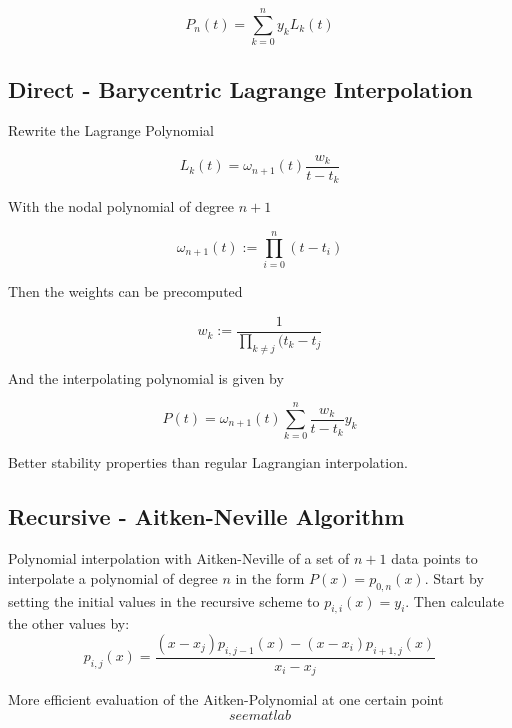 \documentclass[
    a4paper,
    11pt
]{article}
\begin{document}
\begin{equation}
    P_n(t) = \sum_{k=0}^n y_k L_k(t)
\end{equation}

\subsection{Direct - Barycentric Lagrange Interpolation}

Rewrite the Lagrange Polynomial

\begin{equation}
    L_k(t) = \omega_{n+1}(t) \frac{w_k}{t-t_k}
\end{equation}

With the nodal polynomial of degree $n+1$

\begin{equation}
    \omega_{n+1}(t) := \prod_{i=0}^n (t - t_i)
\end{equation}

Then the weights can be precomputed

\begin{equation}
    w_k := \frac{1}{\prod_{k\neq j} (t_k - t_j}
\end{equation}

And the interpolating polynomial is given by

\begin{equation}
    P(t) = \omega_{n+1}(t) \sum_{k=0}^n \frac{w_k}{t-t_k} y_k
\end{equation}

Better stability properties than regular Lagrangian interpolation.

\subsection{Recursive - Aitken-Neville Algorithm}

Polynomial interpolation with Aitken-Neville of a set of $n+1$ data points to
interpolate a polynomial of degree $n$ in the form $P(x) = p_{0,n}(x)$. Start by
setting the initial values in the recursive scheme to $p_{i,i}(x)=y_i$. Then
calculate the other values by:
\begin{equation}
    p_{i,j}(x) = \frac{(x-x_j)p_{i,j-1}(x) - (x-x_i)p_{i+1,j}(x)}{x_i - x_j}
\end{equation}

More efficient evaluation of the Aitken-Polynomial at one certain point
\begin{equation}
    see matlab
\end{equation}
\end{document}
